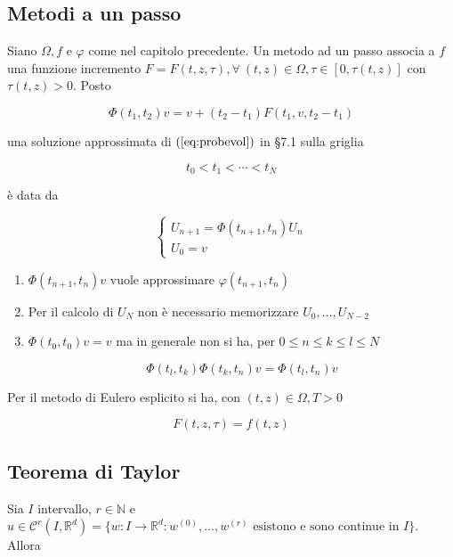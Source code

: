\documentclass[hidelinks, 10pt]{report}
\begin{document}
\subsection{Metodi a un passo}

Siano $ \Omega, f $ e $ \varphi $ come nel capitolo precedente. Un metodo ad un passo associa a $ f $ una funzione incremento $ F = F(t, z, \tau), \forall\ (t, z) \in \Omega, \tau \in [0, \tau(t, z)] $ con $ \tau(t, z) > 0 $. Posto

\[ \Phi (t_{1}, t_{2}) v = v + (t_{2} - t_{1}) F(t_{1}, v, t_{2} - t_{1}) \]

una soluzione approssimata di $ (\ref{eq:probevol}) $ in \S 7.1 sulla griglia

\[ t_{0} < t_{1} < \dotsb < t_{N} \]

\`e data da 

\[
\begin{cases}
U_{n+1} = \Phi(t_{n + 1}, t_{n}) U_{n} \\
U_{0} = v
\end{cases}
\]

\begin{oss}
\noindent
\begin{enumerate}
\item $ \Phi(t_{n+1}, t_{n}) v $ vuole approssimare $ \varphi(t_{n + 1}, t_{n}) $
\item Per il calcolo di $ U_{N} $ non \`e necessario memorizzare $ U_{0}, \dotsc, U_{N - 2} $
\item $ \Phi (t_{0}, t_{0}) v = v $ ma in generale non si ha, per $ 0 \le n \le k \le l \le N $

\[ \Phi(t_{l}, t_{k}) \Phi(t_{k}, t_{n}) v  = \Phi(t_{l}, t_{n}) v \]
\end{enumerate}
\end{oss}

\begin{es}
Per il metodo di Eulero esplicito si ha, con $ (t, z) \in \Omega, T > 0 $

\[ F(t, z, \tau) = f(t, z) \]
\end{es}

\subsection{Teorema di Taylor}

Sia $ I $ intervallo, $ r \in \mathbb{N} $ e $ u \in \mathcal{C}^{r} (I, \mathbb{R}^{d}) = \{ w : I \to \mathbb{R}^{d} : w^{(0)}, \dotsc, w^{(r)} \text{ esistono e sono continue in } I \} $. Allora
\end{document}
